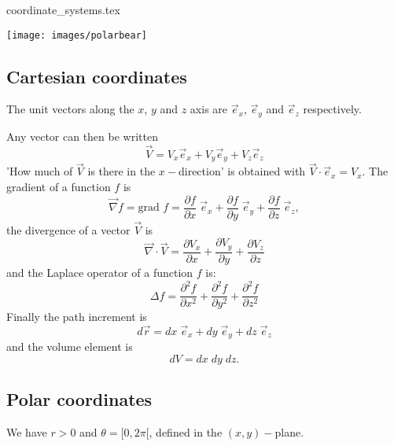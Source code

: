\begin{flushright} {\tiny {\color{gray} coordinate\_systems.tex}} \end{flushright}

\begin{center}
\texttt{[image: images/polarbear]}
\end{center}

\subsection{Cartesian coordinates}

The unit vectors along the $x$, $y$ and $z$ axis are 
$\vec{e}_x$, $\vec{e}_y$ and $\vec{e}_z$ respectively.



\noindent Any vector can then be written
\[
{\vec V}  = V_x {\vec e}_x  + V_y {\vec e}_y + V_z \vec{e}_z
\]
'How much of $\vec{V}$ is there in the $x-$direction' is obtained
with $\vec{V}\cdot\vec{e}_x = V_x$.
The gradient of a function $f$ is 
\[
\vec{\nabla} f= \text{grad }f= 
\frac{\partial f}{\partial x}\; \vec{e}_x +
\frac{\partial f}{\partial y}\; \vec{e}_y +
\frac{\partial f}{\partial z}\; \vec{e}_z,
\]
the divergence of a vector $\vec{V}$ is
\[
\vec{\nabla}\cdot \vec{V} = 
\frac{\partial V_x}{\partial x}+
\frac{\partial V_y}{\partial y}+
\frac{\partial V_z}{\partial z}
\]
and the Laplace operator of a function $f$ is:
\[
\Delta f = 
\frac{\partial^2 f}{\partial x^2} + 
\frac{\partial^2 f}{\partial y^2} + 
\frac{\partial^2 f}{\partial z^2}  
\]
Finally the path increment is
\[
d\vec{r} = dx \; {\vec e}_x  + dy\; {\vec e}_y + dz \; \vec{e}_z
\]
and the volume element is 
\[
dV=dx\; dy \; dz.
\]

\subsection{Polar coordinates}

We have $r>0$ and $\theta=[0,2\pi[$, defined in the $(x,y)-$plane.



